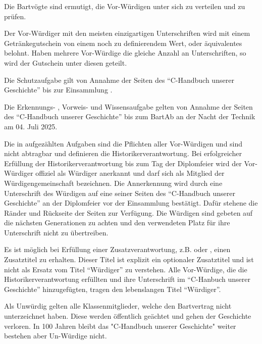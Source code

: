 \documentclass[fontsize=12pt,parskip=half]{scrartcl}
\begin{document}
\begin{contract}
  Die Bartvögte sind ermutigt, die Vor-Würdigen unter sich zu verteilen und zu prüfen.

  Der Vor-Würdiger mit den meisten einzigartigen Unterschriften wird mit einem Getränkegutschein von einem noch zu definierendem Wert, oder äquivalentes
  belohnt. Haben mehrere Vor-Würdige die gleiche Anzahl an Unterschriften, so wird der Gutschein unter diesen geteilt.

  \SubClause[title={Dauer}]
  Die Schutzaufgabe  gilt von Annahme der Seiten des ``C-Handbuch unserer Geschichte'' bis zur Einsammlung .

  Die Erkennungs- , Vorweis-  und Wissensaufgabe  gelten von Annahme der Seiten
  des ``C-Handbuch unserer Geschichte'' bis zum BartAb an der Nacht der Technik am 04. Juli 2025.

  \Clause[title={Historikerverantwortung}]\label{H.verantwortung}
  Die in  aufgezählten Aufgaben sind die Pflichten aller Vor-Würdigen und sind nicht abtragbar und definieren die Historikerverantwortung.
  Bei erfolgreicher Erfüllung der Historikerverantwortung bis zum Tag der Diplomfeier wird der Vor-Würdiger offiziel als Würdiger anerkannt und darf sich
  als Mitglied der Würdigengemeinschaft bezeichnen. Die Annerkennung wird durch eine Unterschrift des Würdigen auf eine seiner Seiten des ``C-Handbuch unserer Geschichte''
  an der Diplomfeier vor der Einsammlung  bestätigt. Dafür stehene die Ränder und Rückseite der Seiten zur Verfügung. Die Würdigen sind
  gebeten auf die nächsten Generationen zu achten und den verwendeten Platz für ihre Unterschrift nicht zu übertreiben.

  \SubClause[title={Zusatztitel}]
  Es ist möglich bei Erfüllung einer Zusatzverantwortung, z.B.  oder , einen Zusatztitel zu erhalten. Dieser Titel ist explizit ein optionaler
  Zusatztitel und ist nicht als Ersatz vom Titel ``Würdiger'' zu verstehen. Alle Vor-Würdige, die die Historikerverantwortung  erfüllten und ihre Unterschrift
  im ``C-Hanbuch unserer Geschichte'' hinzugefügten, tragen den lebenslangen Titel ``Würdiger''.

  \Clause[title={Un-Würdige}]
  Als Unwürdig gelten alle Klassenmitglieder, welche den Bartvertrag nicht unterzeichnet haben. Diese werden öffentlich geächtet und gehen der Geschichte verloren. In 100 Jahren
  bleibt das "C-Handbuch unserer Geschichte" weiter bestehen aber Un-Würdige nicht.


\end{contract}
\end{document}
